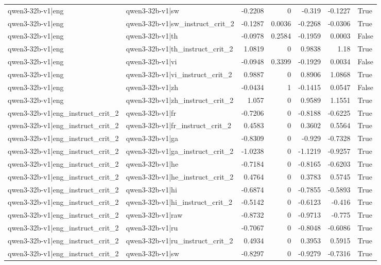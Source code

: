 \begin{table}
\begin{tabular}{l l r r r r l}
qwen3-32b-v1|eng & qwen3-32b-v1|sw & -0.2208 & 0 & -0.319 & -0.1227 & True \\
qwen3-32b-v1|eng & qwen3-32b-v1|sw_instruct_crit_2 & -0.1287 & 0.0036 & -0.2268 & -0.0306 & True \\
qwen3-32b-v1|eng & qwen3-32b-v1|th & -0.0978 & 0.2584 & -0.1959 & 0.0003 & False \\
qwen3-32b-v1|eng & qwen3-32b-v1|th_instruct_crit_2 & 1.0819 & 0 & 0.9838 & 1.18 & True \\
qwen3-32b-v1|eng & qwen3-32b-v1|vi & -0.0948 & 0.3399 & -0.1929 & 0.0034 & False \\
qwen3-32b-v1|eng & qwen3-32b-v1|vi_instruct_crit_2 & 0.9887 & 0 & 0.8906 & 1.0868 & True \\
qwen3-32b-v1|eng & qwen3-32b-v1|zh & -0.0434 & 1 & -0.1415 & 0.0547 & False \\
qwen3-32b-v1|eng & qwen3-32b-v1|zh_instruct_crit_2 & 1.057 & 0 & 0.9589 & 1.1551 & True \\
qwen3-32b-v1|eng_instruct_crit_2 & qwen3-32b-v1|fr & -0.7206 & 0 & -0.8188 & -0.6225 & True \\
qwen3-32b-v1|eng_instruct_crit_2 & qwen3-32b-v1|fr_instruct_crit_2 & 0.4583 & 0 & 0.3602 & 0.5564 & True \\
qwen3-32b-v1|eng_instruct_crit_2 & qwen3-32b-v1|ga & -0.8309 & 0 & -0.929 & -0.7328 & True \\
qwen3-32b-v1|eng_instruct_crit_2 & qwen3-32b-v1|ga_instruct_crit_2 & -1.0238 & 0 & -1.1219 & -0.9257 & True \\
qwen3-32b-v1|eng_instruct_crit_2 & qwen3-32b-v1|he & -0.7184 & 0 & -0.8165 & -0.6203 & True \\
qwen3-32b-v1|eng_instruct_crit_2 & qwen3-32b-v1|he_instruct_crit_2 & 0.4764 & 0 & 0.3783 & 0.5745 & True \\
qwen3-32b-v1|eng_instruct_crit_2 & qwen3-32b-v1|hi & -0.6874 & 0 & -0.7855 & -0.5893 & True \\
qwen3-32b-v1|eng_instruct_crit_2 & qwen3-32b-v1|hi_instruct_crit_2 & -0.5142 & 0 & -0.6123 & -0.416 & True \\
qwen3-32b-v1|eng_instruct_crit_2 & qwen3-32b-v1|raw & -0.8732 & 0 & -0.9713 & -0.775 & True \\
qwen3-32b-v1|eng_instruct_crit_2 & qwen3-32b-v1|ru & -0.7067 & 0 & -0.8048 & -0.6086 & True \\
qwen3-32b-v1|eng_instruct_crit_2 & qwen3-32b-v1|ru_instruct_crit_2 & 0.4934 & 0 & 0.3953 & 0.5915 & True \\
qwen3-32b-v1|eng_instruct_crit_2 & qwen3-32b-v1|sw & -0.8297 & 0 & -0.9279 & -0.7316 & True \\

\end{tabular}
\end{table}
